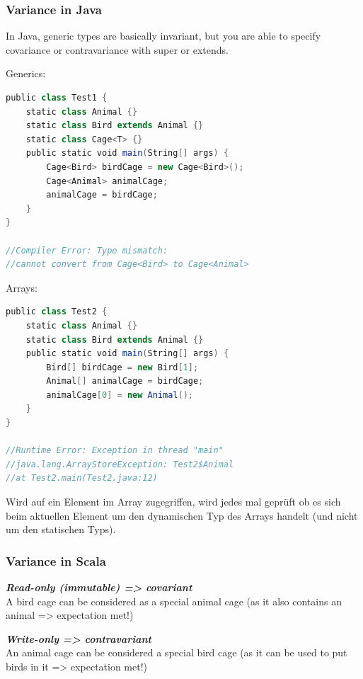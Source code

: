 \hypertarget{variance-in-java}{%
\subsubsection{Variance in Java}\label{variance-in-java}}

In Java, generic types are basically invariant, but you are able to
specify covariance or contravariance with super or extends.

Generics:

\begin{lstlisting}[language=scala,mathescape=false]
public class Test1 {
    static class Animal {}
    static class Bird extends Animal {}
    static class Cage<T> {}
    public static void main(String[] args) {
        Cage<Bird> birdCage = new Cage<Bird>();
        Cage<Animal> animalCage;
        animalCage = birdCage;
    }
}

//Compiler Error: Type mismatch:
//cannot convert from Cage<Bird> to Cage<Animal>
\end{lstlisting}

Arrays:

\begin{lstlisting}[language=scala,mathescape=false]
public class Test2 {
    static class Animal {}
    static class Bird extends Animal {}
    public static void main(String[] args) {
        Bird[] birdCage = new Bird[1];
        Animal[] animalCage = birdCage;
        animalCage[0] = new Animal();
    }
}

//Runtime Error: Exception in thread "main"
//java.lang.ArrayStoreException: Test2$Animal
//at Test2.main(Test2.java:12)
\end{lstlisting}

Wird auf ein Element im Array zugegriffen, wird jedes mal geprüft ob es
sich beim aktuellen Element um den dynamischen Typ des Arrays handelt
(und nicht um den statischen Typs).

\hypertarget{variance-in-scala}{%
\subsubsection{Variance in Scala}\label{variance-in-scala}}

\textbf{\textit{Read-only (immutable) =\textgreater{} covariant}}\\
A bird cage can be considered as a special animal cage (as it also
contains an animal =\textgreater{} expectation met!)

\textbf{\textit{Write-only =\textgreater{} contravariant}}\\
An animal cage can be considered a special bird cage (as it can be used
to put birds in it =\textgreater{} expectation met!)

